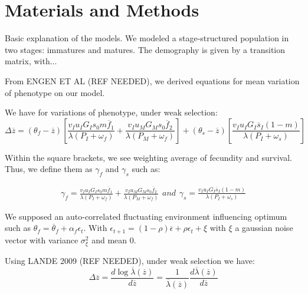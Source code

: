 \section*{Materials and Methods}

Basic explanation of the models. We modeled a stage-structured population in two stages: immatures and matures. The demography is given by a transition matrix, with...

From ENGEN ET AL (REF NEEDED), we derived equations for mean variation of phenotype on our model.

We have for variations of phenotype, under weak selection:
\begin{equation}
\Delta\overline{z} = (\theta_{f} - \overline{z}) \left[ \frac{ v_{I} u_{I} G_{I} s_{0} m \overline{f}_{1} }{\lambda(P_{I}+\omega_{f})} + \frac{ v_{I} u_{M} G_{M} s_{0} \overline{f}_{2}} {\lambda ( P_{M} + \omega_{f} )} \right] + (\theta_{s} - \overline{z}) \left[ \frac{ v_{I} u_{I} G_{I} \overline{s}_{I} (1-m) }{\lambda(P_{I}+\omega_{s})} \right]
\end{equation}

Within the square brackets, we see weighting average of fecundity and survival. Thus, we define them as $\gamma_{f}$ and $\gamma_{s}$ such as:

\begin{subequations}
	\begin{align}
	\gamma_{f} = \frac{ v_{I} u_{I} G_{I} s_{0} m \overline{f}_{1} }{\lambda(P_{I}+\omega_{f})} + \frac{ v_{I} u_{M} G_{M} s_{0} \overline{f}_{2}} {\lambda ( P_{M} + \omega_{f} )}
	\end{align}
	and
	\begin{align}
	\gamma_{s} = \frac{ v_{I} u_{I} G_{I} \overline{s}_{I} (1-m) }{\lambda(P_{I}+\omega_{s})}
	\end{align}
\end{subequations}

We supposed an auto-correlated fluctuating environment influencing optimum such as $\theta_{f} = \overline{\theta}_{f} + \alpha_{f}\epsilon_{t}$. With $\epsilon_{t+1} = (1-\rho)\overline{\epsilon} + \rho\epsilon_{t} + \xi$ with $\xi$ a gaussian noise vector with variance $\sigma^{2}_{\xi}$ and mean $0$.

Using LANDE 2009 (REF NEEDED), under weak selection we have:
\begin{equation}
	\Delta\overline{z} = \frac{d\log\overline{\lambda}(\overline{z})}{d\overline{z}} = \frac{1}{\overline{\lambda}(\overline{z})} \frac{d\overline{\lambda}(\overline{z})}{d\overline{z}}
\end{equation}

